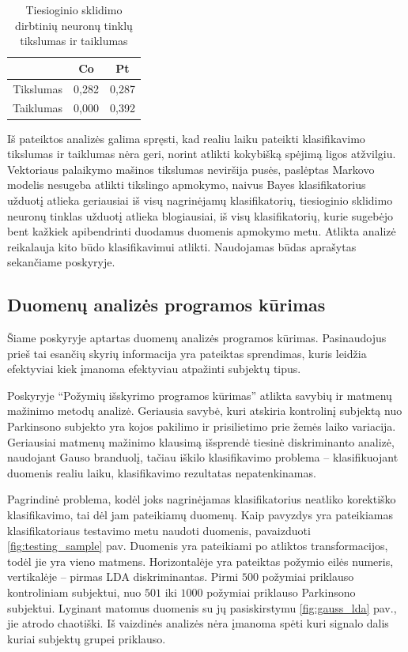 \documentclass[]{vgtuef}
\begin{document}
\begin{table}[!t]
  \centering
  \caption{Tiesioginio sklidimo dirbtinių neuronų tinklų tikslumas ir taiklumas}
  \label{table:ffn_scores}
  \begin{tabular}{|c|c|c|} \hline
    & Co & Pt \\ \hline
    Tikslumas & 0,282 & 0,287 \\ \hline
    Taiklumas & 0,000 & 0,392 \\ \hline
  \end{tabular}
\end{table}

Iš pateiktos analizės galima spręsti, kad realiu laiku pateikti klasifikavimo tikslumas ir taiklumas nėra geri, norint atlikti kokybišką spėjimą ligos atžvilgiu. Vektoriaus palaikymo mašinos tikslumas neviršija pusės, paslėptas Markovo modelis nesugeba atlikti tikslingo apmokymo, naivus Bayes klasifikatorius užduotį atlieka geriausiai iš visų nagrinėjamų klasifikatorių, tiesioginio sklidimo neuronų tinklas užduotį atlieka blogiausiai, iš visų klasifikatorių, kurie sugebėjo bent kažkiek apibendrinti duodamus duomenis apmokymo metu. Atlikta analizė reikalauja kito būdo klasifikavimui atlikti. Naudojamas būdas aprašytas sekančiame poskyryje.

\subsection{Duomenų analizės programos kūrimas}

Šiame poskyryje aptartas duomenų analizės programos kūrimas. Pasinaudojus prieš tai esančių skyrių informacija yra pateiktas sprendimas, kuris leidžia efektyviai kiek įmanoma efektyviau atpažinti subjektų tipus.

Poskyryje ``Požymių išskyrimo programos kūrimas'' atlikta savybių ir matmenų mažinimo metodų analizė. Geriausia savybė, kuri atskiria kontrolinį subjektą nuo Parkinsono subjekto yra kojos pakilimo ir prisilietimo prie žemės laiko variacija. Geriausiai matmenų mažinimo klausimą išsprendė tiesinė diskriminanto analizė, naudojant Gauso branduolį, tačiau iškilo klasifikavimo problema -- klasifikuojant duomenis realiu laiku, klasifikavimo rezultatas nepatenkinamas. 

Pagrindinė problema, kodėl joks nagrinėjamas klasifikatorius neatliko korektiško klasifikavimo, tai dėl jam pateikiamų duomenų. Kaip pavyzdys yra pateikiamas klasifikatoriaus testavimo metu naudoti duomenis, pavaizduoti \ref{fig:testing_sample} pav. Duomenis yra pateikiami po atliktos transformacijos, todėl jie yra vieno matmens. Horizontalėje yra pateiktas požymio eilės numeris, vertikalėje -- pirmas LDA diskriminantas. Pirmi $500$ požymiai priklauso kontroliniam subjektui, nuo $501$ iki $1000$ požymiai priklauso Parkinsono subjektui. Lyginant matomus duomenis su jų pasiskirstymu \ref{fig:gauss_lda} pav., jie atrodo chaotiški. Iš vaizdinės analizės nėra įmanoma spėti kuri signalo dalis kuriai subjektų grupei priklauso. 
\end{document}

